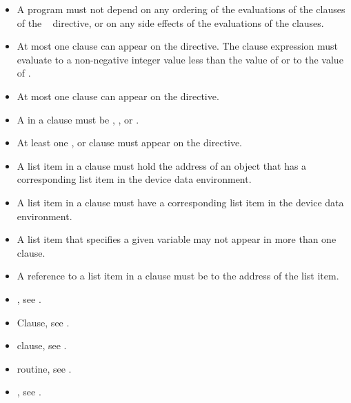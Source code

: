 \restrictions
\begin{itemize}
\item A program must not depend on any ordering of the evaluations of the
      clauses of the ~ directive, or on any side 
      effects of the evaluations of the clauses.
\item At most one  clause can appear on the directive. The
       clause expression  must evaluate to a non-negative integer
      value less than the value of  or to the value of
      .
\item At most one  clause can appear on the directive.
\item A  in a  clause must be , , 
       or .
\item At least one ,  or 
      clause must appear on the directive.
\item A list item in a  clause must hold the address of
      an object that has a corresponding list item in the device data environment.
\item A list item in a  clause must have a
      corresponding list item in the device data environment.
\item A list item that specifies a given variable may not appear in more than
      one  clause.
\item A reference to a list item in a  clause must be to
      the address of the list item.
\end{itemize}


\crossreferences
\begin{itemize}
\item {}, see
.

\item {} Clause, see .

\item {} clause, see
.

\item {} routine, see .

\item {}, see
.

\end{itemize}



